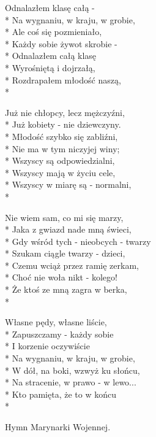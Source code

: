 \begin{lyrics}[longestline={Gdy wśród tych - nieobcych - twarzy}]
Odnalazłem klasę całą -\\*
Na wygnaniu, w kraju, w grobie,\\*
Ale coś się pozmieniało,\\*
Każdy sobie żywot skrobie -\\*
Odnalazłem całą klasę\\*
Wyrośniętą i dojrzałą,\\*
Rozdrapałem młodość naszą,\\*

Już nie chłopcy, lecz mężczyźni,\\*
Już kobiety - nie dziewczyny.\\*
Młodość szybko się zabliźni,\\*
Nie ma w tym niczyjej winy;\\*
Wszyscy są odpowiedzialni,\\*
Wszyscy mają w życiu cele,\\*
Wszyscy w miarę są - normalni,\\*

Nie wiem sam, co mi się marzy,\\*
Jaka z gwiazd nade mną świeci,\\*
Gdy wśród tych - nieobcych - twarzy\\*
Szukam ciągle twarzy - dzieci,\\*
Czemu wciąż przez ramię zerkam,\\*
Choć nie woła nikt - kolego!\\*
Że ktoś ze mną zagra w berka,\\*

Własne pędy, własne liście,\\*
Zapuszczamy - każdy sobie\\*
I korzenie oczywiście\\*
Na wygnaniu, w kraju, w grobie,\\*
W dół, na boki, wzwyż ku słońcu,\\*
Na stracenie, w prawo - w lewo...\\*
Kto pamięta, że to w końcu\\*
\end{lyrics}



\begin{info}Hymn Marynarki Wojennej.\end{info}

